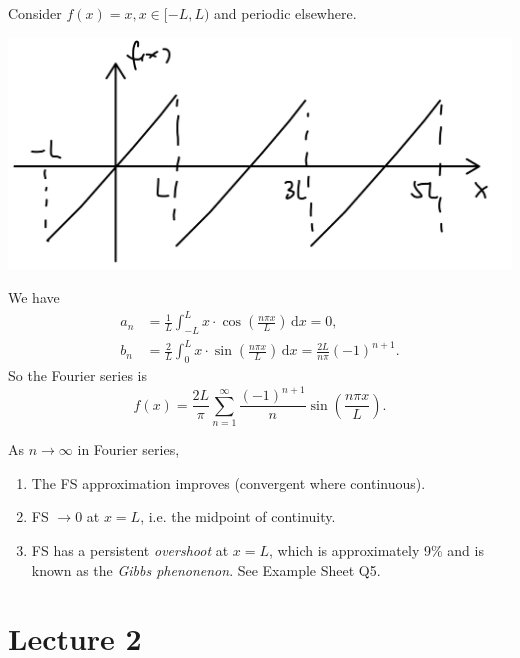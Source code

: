 \documentclass[a4paper]{article}
\begin{document}
\begin{example}
    Consider $f(x)=x,x\in [-L,L)$ and periodic elsewhere.
    \begin{center}
        \includegraphics[scale=0.1]{methods2.jpeg}
    \end{center}
    We have 
    \begin{align*}
        a_n &= \frac{1}{L}\int_{-L}^{L} x\cdot \cos \left( \frac{n\pi x}{L} \right) \,\mathrm{d}x=0,\\ 
        b_n &= \frac{2}{L} \int_{0}^{L} x\cdot \sin \left( \frac{n\pi x}{L} \right) \,\mathrm{d}x = \frac{2L}{n\pi }(-1)^{n+1}.
    \end{align*}
    So the Fourier series is 
    \begin{equation}
        f(x) = \frac{2L}{\pi } \sum_{n=1}^{\infty}\frac{(-1)^{n+1}}{n}\sin \left( \frac{n\pi x}{L} \right).
    \end{equation}
\end{example}
\begin{note}
    As $n\to \infty$ in Fourier series,
    \begin{enumerate}
        \item The FS approximation improves (convergent where continuous).
        \item FS $ \to 0 $ at $x=L$, i.e. the midpoint of continuity.
        \item FS has a persistent \textit{overshoot} at $x=L$, which is approximately 9\% and is known as the \textit{Gibbs phenonenon}. See Example Sheet Q5.
    \end{enumerate}
\end{note}
\newpage
\part*{Lecture 2}
\end{document}

